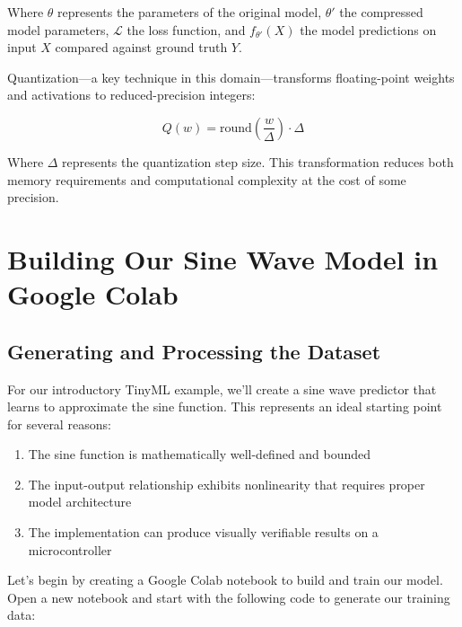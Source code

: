 \documentclass[
  9pt,
  letterpaper,
  abstract,
  titlepage]{scrbook}
\providecommand{\tightlist}{%
  \setlength{\itemsep}{0pt}\setlength{\parskip}{0pt}}\usepackage{longtable,booktabs,array}
\def\tightlist{}
\let\tightlist\relax
\begin{document}
Where \(\theta\) represents the parameters of the original model,
\(\theta'\) the compressed model parameters, \(\mathcal{L}\) the loss
function, and \(f_{\theta'}(X)\) the model predictions on input \(X\)
compared against ground truth \(Y\).

Quantization---a key technique in this domain---transforms
floating-point weights and activations to reduced-precision integers:

\[Q(w) = \text{round}\left(\frac{w}{\Delta}\right) \cdot \Delta\]

Where \(\Delta\) represents the quantization step size. This
transformation reduces both memory requirements and computational
complexity at the cost of some precision.

\section{Building Our Sine Wave Model in Google
Colab}\label{building-our-sine-wave-model-in-google-colab}

\subsection{Generating and Processing the
Dataset}\label{generating-and-processing-the-dataset}

For our introductory TinyML example, we'll create a sine wave predictor
that learns to approximate the sine function. This represents an ideal
starting point for several reasons:

\begin{enumerate}
\def\labelenumi{\arabic{enumi}.}
\tightlist
\item
  The sine function is mathematically well-defined and bounded
\item
  The input-output relationship exhibits nonlinearity that requires
  proper model architecture
\item
  The implementation can produce visually verifiable results on a
  microcontroller
\end{enumerate}

Let's begin by creating a Google Colab notebook to build and train our
model. Open a new notebook and start with the following code to generate
our training data:
\end{document}
